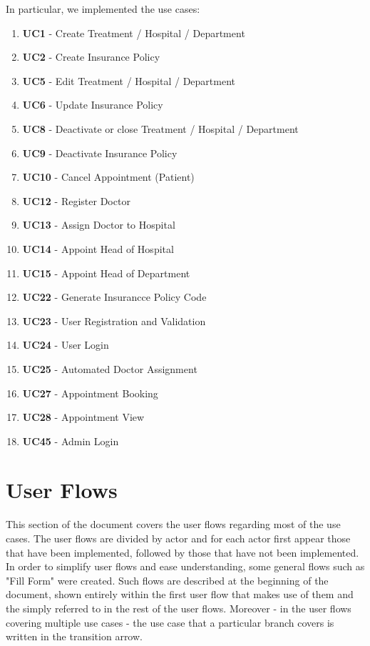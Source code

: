 \documentclass[12pt, a4paper]{article}
\begin{document}
In particular, we implemented the use cases:

\begin{enumerate}
    \item \textbf{UC1} - Create Treatment / Hospital / Department 
    \item \textbf{UC2} - Create Insurance Policy 
    \item \textbf{UC5} - Edit Treatment / Hospital / Department 
    \item \textbf{UC6} - Update Insurance Policy    
    \item \textbf{UC8} - Deactivate or close Treatment / Hospital / Department  
    \item \textbf{UC9} - Deactivate Insurance Policy    
    \item \textbf{UC10} - Cancel Appointment (Patient) 
    \item \textbf{UC12} - Register Doctor   
    \item \textbf{UC13} - Assign Doctor to Hospital 
    \item \textbf{UC14} - Appoint Head of Hospital  
    \item \textbf{UC15} - Appoint Head of Department 
    \item \textbf{UC22} - Generate Insurancce Policy Code 
    \item \textbf{UC23} - User Registration and Validation
    \item \textbf{UC24} - User Login  
    \item \textbf{UC25} - Automated Doctor Assignment 
    \item \textbf{UC27} - Appointment Booking 
    \item \textbf{UC28} - Appointment View 
    \item \textbf{UC45} - Admin Login
\end{enumerate}


\section{User Flows}
This section of the document covers the user flows regarding most of the use cases. The user flows are divided by actor and for each actor first appear those that have been implemented, followed by those that have not been implemented.
In order to simplify user flows and ease understanding, some general flows such as "Fill Form" were created. Such flows are described at the beginning of the document, shown entirely within the first user flow that makes use of them and the simply referred to in the rest of the user flows. Moreover - in the user flows covering multiple use cases - the use case that a particular branch covers is written in the transition arrow.
\end{document}
